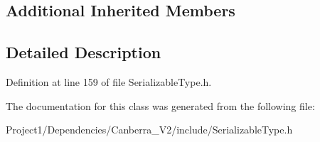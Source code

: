 \subsection*{Additional Inherited Members}


\subsection{Detailed Description}


Definition at line 159 of file Serializable\+Type.\+h.



The documentation for this class was generated from the following file\+:\begin{DoxyCompactItemize}
\item 
Project1/\+Dependencies/\+Canberra\+\_\+\+V2/include/Serializable\+Type.\+h\end{DoxyCompactItemize}
